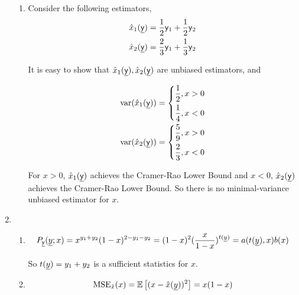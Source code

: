 \documentclass[a4paper]{article}
\begin{document}
\begin{enumerate}
\begin{enumerate}
    \item Consider the following estimators,
    \begin{equation}
      \begin{aligned}
        \hat{x}_1 (\underline{\mathsf{y}}) = \frac{1}{2} \mathsf{y}_1 + \frac{1}{2} \mathsf{y}_2 \\
      \hat{x}_2 (\underline{\mathsf{y}}) = \frac{2}{3} \mathsf{y}_1 + \frac{1}{3} \mathsf{y}_2
      \end{aligned}
    \end{equation}
  
    It is easy to show that $\hat{x}_1 (\underline{\mathsf{y}}),\hat{x}_2 (\underline{\mathsf{y}})$ are unbiased estimators, and 
  
    \begin{equation}
      \begin{aligned}
        \operatorname{var}(\hat{x}_1 (\underline{\mathsf{y}})) = \left\{\begin{aligned}
          \frac{1}{2}, x>0 \\
          \frac{1}{4}, x<0 
        \end{aligned}\right. \\
        \operatorname{var}(\hat{x}_2 (\underline{\mathsf{y}})) = \left\{\begin{aligned}
          \frac{5}{9}, x>0 \\
          \frac{2}{3}, x<0 
        \end{aligned}\right.
      \end{aligned}
    \end{equation}
  
    For $x>0$, $\hat{x}_1 (\underline{\mathsf{y}})$ achieves the Cramer-Rao Lower Bound and $x<0$, $\hat{x}_2 (\underline{\mathsf{y}})$ achieves the Cramer-Rao Lower Bound. So there is no minimal-variance unbiased estimator for $x$.
  
  \end{enumerate}

  \item \begin{enumerate}
    \item \begin{equation}
      P_{\underline{\mathsf{y}}}(\underline{y};x) = x^{y_1+ y_2} (1-x)^{2-y_1-y_2} = (1-x)^2 (\frac{x}{1-x})^{t(\underline{y})} = a(t(\underline{y}),x)b(x)
    \end{equation}

    So $t(\underline{y}) = y_1+y_2$ is a sufficient statistics for $x$.

    \item \begin{equation}
      \operatorname{MSE}_{\hat{x}}(x) = \operatorname{\mathbb{E}} \left[(x-\hat{x}(\underline{y}))^2\right] = x(1-x)
    \end{equation}


\end{enumerate}
\end{enumerate}
\end{document}
